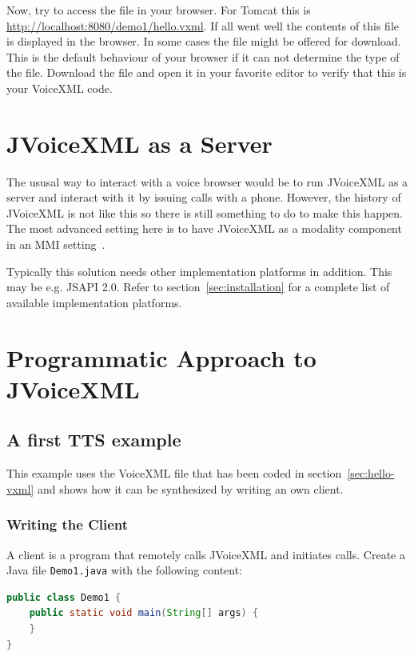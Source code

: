 \documentclass[11pt,a4paper]{book}
\begin{document}
Now, try to access the file in your browser. For Tomcat this is
\url{http://localhost:8080/demo1/hello.vxml}. If all went well the
contents of this file is displayed in the browser. In some cases the file
might be offered for download. This is the default behaviour of your browser if
it can not determine the type of the file. Download the file and open it in your
favorite editor to verify that this is your VoiceXML code.


\chapter{JVoiceXML as a Server}
\label{cha:callmanager}

The ususal way to interact with a voice browser would be to run JVoiceXML as a
server and interact with it by issuing calls with a phone. However, the history
of JVoiceXML is not like this so there is still something to do to make this
happen. The most advanced setting here is to have JVoiceXML as a modality
component in an MMI setting~\cite{w3c:mmi}.

Typically this solution needs other implementation platforms in addition. This
may be e.g. JSAPI 2.0. Refer to section~\ref{sec:installation} for a complete
list of available implementation platforms.

\chapter{Programmatic Approach to JVoiceXML}
\label{cha:programmatic-approach}

\section{A first TTS example}
\label{sec:first-tts-example}

This example uses the VoiceXML file that has been coded in
section~\ref{sec:hello-vxml} and shows how it can be synthesized by writing an
own client.

\subsection{Writing the Client}

A client is a program that remotely calls JVoiceXML and initiates calls. Create 
a Java file \texttt{Demo1.java} with the following content:

\begin{lstlisting}[language=Java]
public class Demo1 {
    public static void main(String[] args) {
    }
}
\end{lstlisting}
\end{document}
